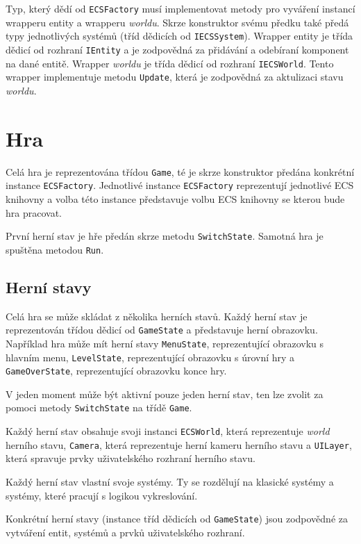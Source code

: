 Typ, který dědí od \texttt{ECSFactory} musí implementovat metody pro vyváření instancí wrapperu entity a wrapperu \textit{worldu}. Skrze konstruktor svému předku také předá typy jednotlivých systémů (tříd dědicích od \texttt{IECSSystem}). Wrapper entity je třída dědicí od rozhraní \texttt{IEntity} a je zodpovědná za přidávání a odebíraní komponent na dané entitě. Wrapper \textit{worldu} je třída dědicí od rozhraní \texttt{IECSWorld}. Tento wrapper implementuje metodu \texttt{Update}, která je zodpovědná za aktulizaci stavu \textit{worldu}.

\section{Hra}
Celá hra je reprezentována třídou \texttt{Game}, té je skrze konstruktor předána konkrétní instance \texttt{ECSFactory}. Jednotlivé instance \texttt{ECSFactory} reprezentují jednotlivé ECS knihovny a volba této instance představuje volbu ECS knihovny se kterou bude hra pracovat.

První herní stav je hře předán skrze metodu \texttt{SwitchState}. Samotná hra je spuštěna metodou \texttt{Run}.

\subsection{Herní stavy}
Celá hra se může skládat z několika herních stavů. Každý herní stav je reprezentován třídou dědicí od \texttt{GameState} a představuje herní obrazovku. Například hra může mít herní stavy \texttt{MenuState}, reprezentující obrazovku s hlavním menu, \texttt{LevelState}, reprezentující obrazovku s úrovní hry a \texttt{GameOverState}, reprezentující obrazovku konce hry.

V jeden moment může být aktivní pouze jeden herní stav, ten lze zvolit za pomoci metody \texttt{SwitchState} na třídě \texttt{Game}.

Každý herní stav obsahuje svoji instanci \texttt{ECSWorld}, která reprezentuje \textit{world} herního stavu, \texttt{Camera}, která reprezentuje herní kameru herního stavu a \texttt{UILayer}, která spravuje prvky uživatelského rozhraní herního stavu.

Každý herní stav vlastní svoje systémy. Ty se rozdělují na klasické systémy a systémy, které pracují s logikou vykreslování.

Konkrétní herní stavy (instance tříd dědicích od \texttt{GameState}) jsou zodpovědné za vytváření entit, systémů a prvků uživatelského rozhraní.

